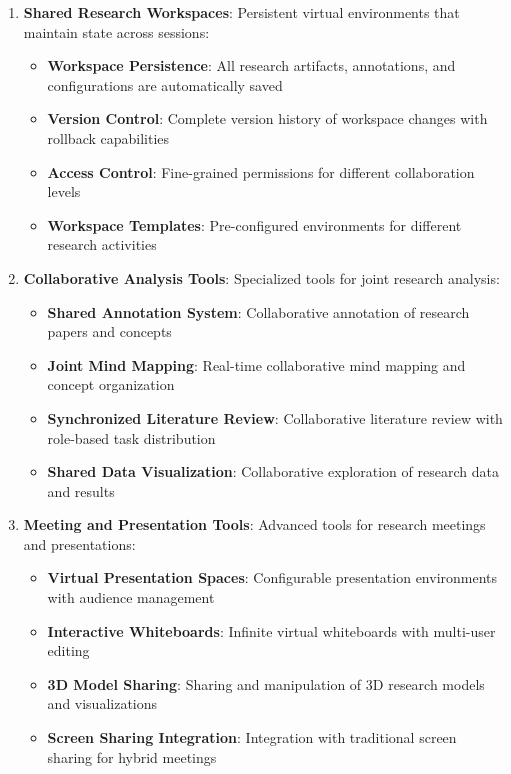 \documentclass[10pt,twocolumn]{article}
\begin{document}
\begin{enumerate}
    \item \textbf{Shared Research Workspaces}: Persistent virtual environments that maintain state across sessions:
    \begin{itemize}
        \item \textbf{Workspace Persistence}: All research artifacts, annotations, and configurations are automatically saved
        \item \textbf{Version Control}: Complete version history of workspace changes with rollback capabilities
        \item \textbf{Access Control}: Fine-grained permissions for different collaboration levels
        \item \textbf{Workspace Templates}: Pre-configured environments for different research activities
    \end{itemize}
    
    \item \textbf{Collaborative Analysis Tools}: Specialized tools for joint research analysis:
    \begin{itemize}
        \item \textbf{Shared Annotation System}: Collaborative annotation of research papers and concepts
        \item \textbf{Joint Mind Mapping}: Real-time collaborative mind mapping and concept organization
        \item \textbf{Synchronized Literature Review}: Collaborative literature review with role-based task distribution
        \item \textbf{Shared Data Visualization}: Collaborative exploration of research data and results
    \end{itemize}
    
    \item \textbf{Meeting and Presentation Tools}: Advanced tools for research meetings and presentations:
    \begin{itemize}
        \item \textbf{Virtual Presentation Spaces}: Configurable presentation environments with audience management
        \item \textbf{Interactive Whiteboards}: Infinite virtual whiteboards with multi-user editing
        \item \textbf{3D Model Sharing}: Sharing and manipulation of 3D research models and visualizations
        \item \textbf{Screen Sharing Integration}: Integration with traditional screen sharing for hybrid meetings
    \end{itemize}
\end{enumerate}
\end{document}
